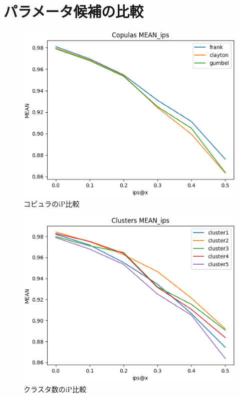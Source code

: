 \appendix
\chapter{パラメータ候補の比較}\label{ch:appendix}
\begin{figure}[H]
  \begin{center}
    \includegraphics[width=7in]{source/copula_ip.eps}
  \vspace{1mm}
  \caption{コピュラのiP比較} %
  \label{fig:copula_ip}
  \end{center} 
\end{figure}
\begin{figure}[H]
  \begin{center}
    \includegraphics[width=7in]{source/cluster_ip.eps}
  \vspace{1mm}
  \caption{クラスタ数のiP比較} %
  \label{fig:cluster_ip}
  \end{center} 
\end{figure}
